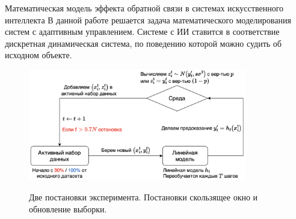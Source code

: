 \documentclass{beamer}
\begin{document}
\begin{frame}{Математическая модель эффекта обратной связи в системах искусственного интеллекта}
    \vspace{-2mm}
    В данной работе решается задача математического моделирования систем с адаптивным управлением. Системе с ИИ ставится в соответствие дискретная динамическая система, по поведению которой можно судить об исходном объекте.
    \vspace{-1mm}
    \begin{figure}
        \centering
        \includegraphics[width=0.85\textwidth]{fig/Experiment_setups.png}
        
        Две постановки эксперимента. Постановки \color{red}скользящее окно \color{black}и \color{blue}обновление выборки.
        \label{exp}
    \end{figure}

\end{frame}
\end{document}
